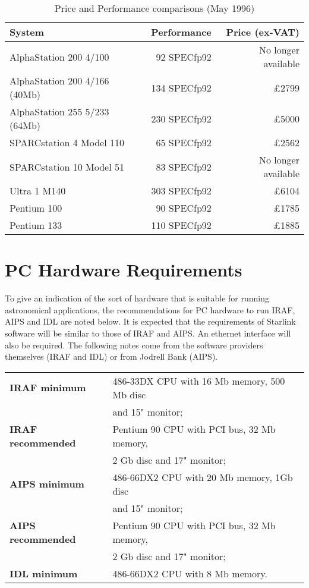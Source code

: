 \begin{table}[h]
\begin{center}
\begin {tabular}{|l|r|r|}
\hline
{\bf System}                 & {\bf Performance}  &   {\bf Price (ex-VAT)} \\
\hline
AlphaStation 200 4/100       &    92 SPECfp92 &   No longer available  \\
AlphaStation 200 4/166 (40Mb)&   134 SPECfp92 &   \pounds 2799  \\
AlphaStation 255 5/233 (64Mb)&   230 SPECfp92 &   \pounds 5000  \\
\hline
SPARCstation 4 Model 110     &    65 SPECfp92 &   \pounds 2562  \\
SPARCstation 10 Model 51     &    83 SPECfp92 &   No longer available  \\
Ultra 1 M140                 &   303 SPECfp92 &   \pounds 6104  \\
\hline 
Pentium 100                  &    90 SPECfp92 &   \pounds 1785  \\
Pentium 133                  &   110 SPECfp92 &   \pounds 1885  \\
\hline 
\end{tabular}
\caption{Price and Performance comparisons (May 1996)}
\end{center}
\end {table}


\section{PC Hardware Requirements}

To give an indication of the sort of hardware that is 
suitable for running astronomical applications, 
the recommendations for PC hardware to run IRAF, AIPS and IDL
are noted below. It is expected that the requirements of Starlink
software will be similar to those of IRAF and AIPS.  An ethernet
interface will also be required. The following notes come from the
software providers themselves (IRAF and IDL) or from Jodrell Bank (AIPS).
 
\begin{tabular}{ll}
{\bf IRAF minimum}  & 486-33DX CPU with 16 Mb memory, 500 Mb disc\\
                    & and 15" monitor;\\
{\bf IRAF recommended} & Pentium 90 CPU with PCI bus, 32 Mb memory,\\
                       & 2 Gb disc and 17" monitor;\\
{\bf AIPS minimum}  & 486-66DX2 CPU with 20 Mb memory, 1Gb disc\\
                    & and 15" monitor;\\
{\bf AIPS recommended} & Pentium 90 CPU with PCI bus, 32 Mb memory,\\
                       & 2 Gb disc and 17" monitor;\\
{\bf IDL minimum}   & 486-66DX2 CPU with 8 Mb memory.
\end{tabular}
 
\newpage
 

